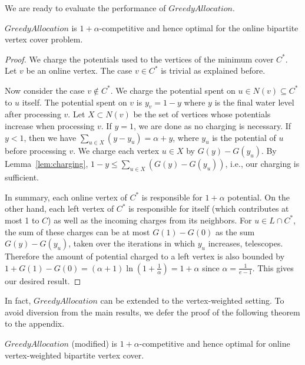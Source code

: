 \documentclass{article}
\begin{document}
We are ready to evaluate the performance of $GreedyAllocation$. 
\begin{theorem}
\label{thm:no alternation}
$GreedyAllocation$ is $1+\alpha$-competitive and hence optimal for the online bipartite vertex cover problem.
\end{theorem}
\begin{proof}
We charge the potentials used to the vertices of the minimum cover $C^*$. Let $v$ be an online vertex. The case $v\in C^*$ is trivial as explained before.



Now consider the case $v\notin C^*$. We charge the potential spent on $u\in N(v)\subseteq C^*$ to $u$ itself. The potential spent on $v$ is $y_v = 1-y$ where $y$ is the final water level after processing $v$. 
Let $X\subset N(v)$ be the set of vertices whose potentials increase when processing $v$.
If $y =1$, we are done as no charging is necessary. If $y <1$, then we have $\sum_{u\in X} (y-y_u) = \alpha +y$, where $y_u$ is the potential of $u$ before processing $v$. We charge each vertex $u\in X$ by $G(y)-G(y_u)$. By Lemma~\ref{lem:charging}, $1-y \leq \sum_{u\in X} (G(y)-G(y_u))$, i.e., our charging is sufficient.



In summary, each online vertex of $C^*$ is responsible for $1+\alpha$ potential. On the other hand, each left vertex of $C^*$ is responsible for itself (which contributes at most 1 to $C$) as well as the incoming charges from its neighbors. For $u\in L\cap C^*$, the sum of these charges can be at most $G(1)-G(0)$ as the sum $G(y)-G(y_u)$, taken over the iterations in which $y_u$ increases, telescopes. Therefore the amount of potential charged to a left vertex is also bounded by $1+G(1)-G(0) = (\alpha+1)\ln (1+\frac{1}{\alpha}) = 1+\alpha$ since $\alpha = \frac{1}{e-1}$.
This gives our desired result.
\end{proof}

In fact, $GreedyAllocation$ can be extended to the vertex-weighted setting. To avoid diversion from the main results, we defer the proof of the following theorem to the appendix.
\begin{theorem}
$GreedyAllocation$ (modified) is $1+\alpha$-competitive and hence optimal for online vertex-weighted bipartite vertex cover.
\end{theorem}
\end{document}
